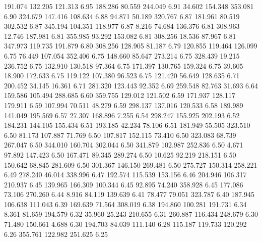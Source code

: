  191.074  132.205  121.313         6.95
 188.286   80.559  244.049         6.91
  34.602  154.348  353.081         6.90
 324.679  147.416  108.634         6.88
  94.871   50.189  320.767         6.87
 181.961   80.519  302.532         6.87
 345.194  104.351  118.977         6.87
   8.216   74.684  136.376         6.81
 308.963   12.746  187.981         6.81
 355.985   93.292  153.082         6.81
 308.256   18.536   87.967         6.81
 347.973  119.735  191.879         6.80
 308.256  128.905   81.187         6.79
 120.855  119.464  126.099         6.75
  76.449  107.054  352.406         6.75
 148.660   85.647  273.214         6.75
 328.439   19.215  236.752         6.75
 132.910  130.518   97.364         6.75
 171.397  130.765  159.324         6.75
  39.605   18.900  172.633         6.75
 119.122  107.380   96.523         6.75
 121.420   56.649  128.635         6.71
 200.452   34.145   16.361         6.71
 281.320  123.443   92.352         6.69
 259.548   82.763   31.693         6.64
 159.586  105.494  288.685         6.60
 359.755  129.012  121.502         6.59
 171.937  128.117  179.911         6.59
 107.994   70.511   48.279         6.59
 298.137  137.016  120.533         6.58
 189.989  141.049  195.569         6.57
  27.307  168.896    7.255         6.54
 298.247  155.925  202.193         6.52
 184.231  144.105  155.434         6.51
 193.185   42.234   78.106         6.51
 181.949   55.505  323.510         6.50
  81.173  107.887   71.769         6.50
 107.817  152.115   73.410         6.50
 323.083   68.739  267.047         6.50
 344.010  160.704  302.044         6.50
 341.879  102.987  252.836         6.50
   4.671   97.892  147.423         6.50
 167.471   89.345  289.274         6.50
  10.625   92.219  218.151         6.50
 150.642   68.845  281.609         6.50
 301.367  146.150  269.481         6.50
 275.727  150.314  258.221         6.49
 278.240   46.014  338.996         6.47
 192.574  115.539  153.156         6.46
 204.946  106.317  210.937         6.45
 139.965  166.309  100.344         6.45
  92.895   74.240  358.928         6.45
 177.086   73.106  270.260         6.44
   8.916   84.119  139.639         6.41
  78.477   79.051  323.787         6.40
 187.945  106.638  111.043         6.39
 169.639   71.564  308.019         6.38
 194.860  100.281  191.731         6.34
   8.361   81.659  194.579         6.32
  35.960   25.243  210.655         6.31
 260.887  116.434  248.679         6.30
  71.480  150.661    4.688         6.30
 194.703   84.039  111.140         6.28
 115.187  119.733  120.292         6.26
 355.761  122.982  251.625         6.25
